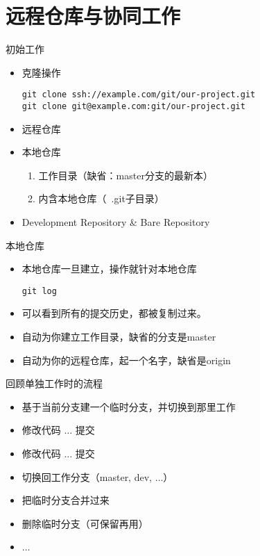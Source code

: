 \part{远程仓库与协同工作}
\begin{frame}[<+->][fragile]{初始工作}
\begin{itemize}
  \item 克隆操作
\begin{Verbatim}[frame=single,commandchars=\\\{\}]
git clone ssh://example.com/git/our-project.git
git clone git@example.com:git/our-project.git
\end{Verbatim}
  \item 远程仓库
  \item 本地仓库
  \begin{enumerate}
    \item 工作目录（缺省：master分支的最新本）
    \item 内含本地仓库（\ .git子目录）
  \end{enumerate}
  \item Development Repository \& Bare Repository
\end{itemize}
\end{frame}

\begin{frame}[<+->][fragile]{本地仓库}
\begin{itemize}
  \item 本地仓库一旦建立，操作就针对本地仓库
\begin{Verbatim}[frame=single,commandchars=\\\{\}]
git log
\end{Verbatim}
  \item 可以看到所有的提交历史，都被复制过来。
  \item 自动为你建立工作目录，缺省的分支是master
  \item 自动为你的远程仓库，起一个名字，缺省是origin
\end{itemize}
\end{frame}

\begin{frame}[<+->][fragile]{回顾单独工作时的流程}
    \begin{itemize}
        \item 基于当前分支建一个临时分支，并切换到那里工作
        \item 修改代码 \(\ldots\) 提交
        \item 修改代码 \(\ldots\) 提交
        \item 切换回工作分支（master, dev, \(\ldots\)）
        \item 把临时分支合并过来
        \item 删除临时分支（可保留再用）
        \item \(\ldots\)
    \end{itemize}
\end{frame}

